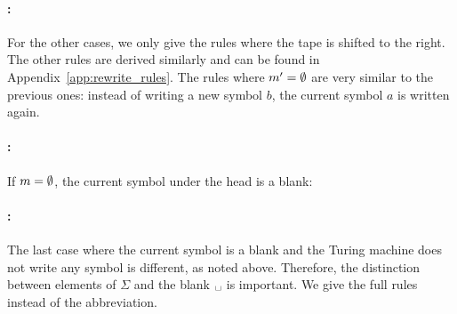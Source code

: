 \paragraph{:}
\begin{center}
  \quad {}
  \quad {}
\end{center}

For the other cases, we only give the rules where the tape is shifted to the right. The other rules are derived similarly and can be found in Appendix~\ref{app:rewrite_rules}. 
The rules where $m' = \emptyset$ are very similar to the previous ones: instead of writing a new symbol $b$, the current symbol $a$ is written again.

\paragraph{:}
\begin{center}
  \quad {}
  \quad {}
\end{center}

If $m = \emptyset$, the current symbol under the head is a blank: 
\paragraph{:}
\begin{center}
  \quad {}
  \quad {}
\end{center}

The last case where the current symbol is a blank and the Turing machine does not write any symbol is different, as noted above. Therefore, the distinction between elements of $\Sigma$ and the blank $\blank$ is important. We give the full rules instead of the abbreviation.

